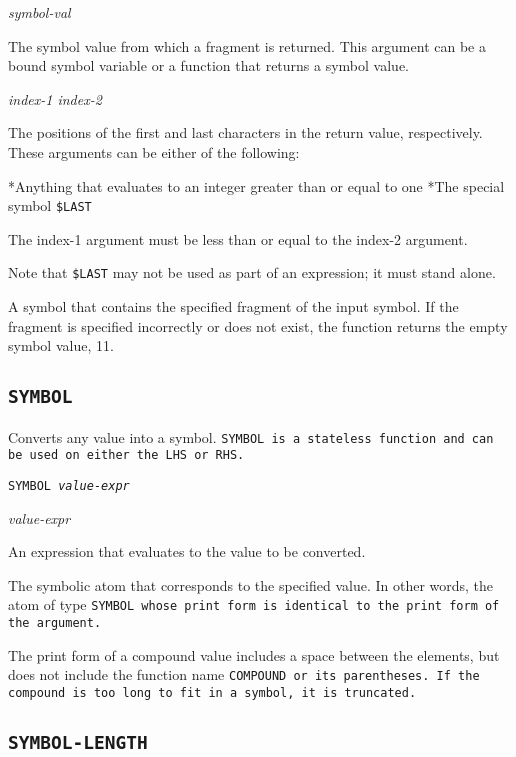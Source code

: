{{\Arguments

\it{symbol-val}

The symbol value from which a fragment is returned. This
argument can be a bound symbol variable or a function that
returns a symbol value.

\it{index-1} \it{index-2}

The positions of the first and last characters in the return
value, respectively. These arguments can be either of the
following:

*Anything that evaluates to an integer greater than or
equal to one
*The special symbol \verb|$LAST|

The index-1 argument must be less than or equal to the
index-2 argument.

Note that \verb|$LAST| may not be used as part of an expression; it
must stand alone.

\ReturnValue

A symbol that contains the specified fragment of the input
symbol. If the fragment is specified incorrectly or does not
exist, the function returns the empty symbol value, 11.

\subsection{\tt{SYMBOL}}

Converts any value into a symbol. \tt{SYMBOL} is a stateless
function and can be used on either the LHS or RHS.

\Format

\tt{SYMBOL} \it{value-expr}

\Argument

\it{value-expr}

An expression that evaluates to the value to be converted.

\ReturnValue

The symbolic atom that corresponds to the specified value. In
other words, the atom of type \tt{SYMBOL} whose print form is
identical to the print form of the argument.

The print form of a compound value includes a space between
the elements, but does not include the function name \tt{COMPOUND}
or its parentheses. If the compound is too long to fit in a
symbol, it is truncated.

\subsection{\tt{SYMBOL-LENGTH}}

}}
